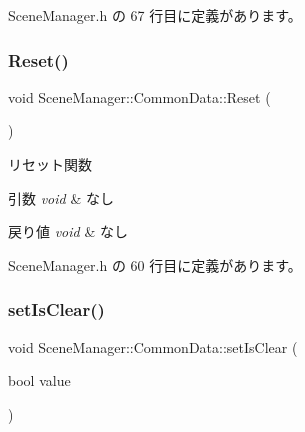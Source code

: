  Scene\+Manager.\+h の 67 行目に定義があります。

\mbox{\label{class_scene_manager_1_1_common_data_a32823be65c187b909e4159cef57931a9}} 
\subsubsection{\texorpdfstring{Reset()}{Reset()}}
{\footnotesize\ttfamily void Scene\+Manager\+::\+Common\+Data\+::\+Reset (\begin{DoxyParamCaption}{ }\end{DoxyParamCaption})\hspace{0.3cm}{\ttfamily [inline]}}



リセット関数 


\begin{DoxyParams}{引数}
{\em void} & なし \\
\hline
\end{DoxyParams}

\begin{DoxyRetVals}{戻り値}
{\em void} & なし \\
\hline
\end{DoxyRetVals}


 Scene\+Manager.\+h の 60 行目に定義があります。

\mbox{\label{class_scene_manager_1_1_common_data_a63ed55beac6b37243cafdbec26870fc3}} 
\subsubsection{\texorpdfstring{set\+Is\+Clear()}{setIsClear()}}
{\footnotesize\ttfamily void Scene\+Manager\+::\+Common\+Data\+::set\+Is\+Clear (\begin{DoxyParamCaption}\item[{bool}]{value }\end{DoxyParamCaption})\hspace{0.3cm}{\ttfamily [inline]}}



